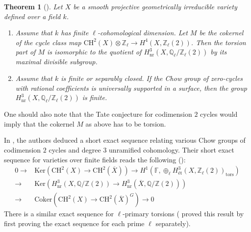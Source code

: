 \documentclass{amsart}
\newtheorem{thm}[theorem]{Theorem}
\theoremstyle{definition}
\theoremstyle{remark}
\newcommand{\mbb}{\mathbb}
\newcommand{\FF}{\mbb{F}}
\newcommand{\QQ}{\mbb{Q}}
\newcommand{\ZZ}{\mbb{Z}}
\begin{document}
 

 \begin{thm}[{\cite[Th\'eor\`eme 2.2, Proposition 3.2]{CTKahnCycleCodim2}}]\label{thm:ctk}
 Let $X$ be a smooth projective geometrically irreducible variety defined over a field $k$.
 \begin{enumerate}
     \item Assume that $k$ has finite $\ell$-cohomological dimension. Let $M$ be the cokernel of the cycle class map $\text{CH}^2(X) \otimes \ZZ_\ell \to H^4(X, \ZZ_\ell(2))$. Then the torsion part of $M$ is isomorphic to the quotient of $H^3_{\text{nr}}(X, \QQ_\ell/\ZZ_\ell(2))$ by its maximal divisible subgroup.
     \item Assume that $k$ is finite or separably closed. If the Chow group of zero-cycles with rational coefficients is universally supported in a surface, then the group $H^3_{\text{nr}}(X, \QQ_\ell/\ZZ_\ell(2))$ is finite.
 \end{enumerate}
     
 \end{thm}
  
 One should also note that the Tate conjecture for codimension $2$ cycles would imply that the cokernel $M$ as above has to be torsion.
 
 In \cite{CTKahnCycleCodim2}, the authors deduced a short exact sequence relating various Chow groups of codimension $2$ cycles and degree $3$ unramified cohomology. 
 Their short exact sequence for varieties over finite fields reads the following (\cite[Th\'eor\`eme 6.8]{CTKahnCycleCodim2}):
 \begin{align}\label{eq:CTK}
    \nonumber 0 \to &\text{Ker}(\text{CH}^2(X) \to \text{CH}^2
(\overline{X})) \to H^1(\FF, \oplus_{\ell} H^3_\text{\'et}(X, \ZZ_\ell(2))_\text{tors})\\
 \to &\text{Ker}(
H^3_\text{nr}(X, \QQ/\ZZ(2)) \to H^3_\text{nr}(\overline{X}, \QQ/\ZZ(2)))\\
\nonumber
\to &\text{Coker}(\text{CH}^2
(X) \to \text{CH}^2(\overline{X})^G)\to 0
 \end{align}
There is a similar exact sequence for $\ell$-primary torsions (\cite{CTKahnCycleCodim2} proved this result by first proving the exact sequence for each prime $\ell$ separately).
\end{document}
